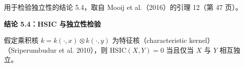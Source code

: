 用于检验独立性的结论 5.4，取自 Mooij et al.（2016）的引理 12（第 47 页）。

\par\medskip{}
\noindent\textbf{结论 5.4：HSIC 与独立性检验}\par
假定乘积核 $k=k(\cdot,x)\otimes k(\cdot,y)$ 为特征核（characteristic kernel）（Sriperumbudur et al. 2010），则 $\mathrm{HSIC}(X,Y)=0$ 当且仅当 $X$ 与 $Y$ 相互独立。
